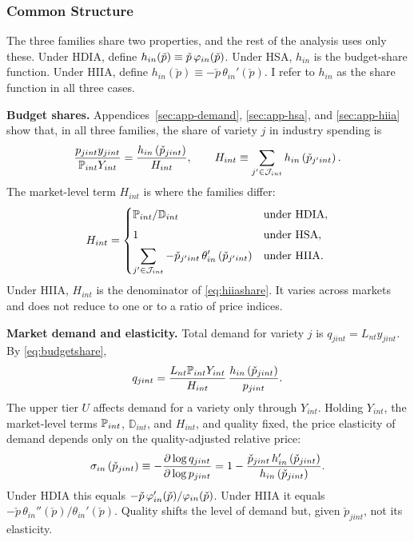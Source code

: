 \subsubsection{Common Structure}\label{sec:common}

The three families share two properties, and the rest of the analysis uses only these.
Under HDIA, define $h_{in}(\check{p}) \equiv \check{p} \, \vp_{in}(\check{p})$.
Under HSA, $h_{in}$ is the budget-share function.
Under HIIA, define $h_{in}(\check{p}) \equiv -\check{p} \, \theta_{in}'(\check{p})$.
I refer to $h_{in}$ as the share function in all three cases.

\textbf{Budget shares.}
Appendices~\ref{sec:app-demand}, \ref{sec:app-hsa}, and \ref{sec:app-hiia} show that, in all three families, the share of variety $j$ in industry spending is
\begin{equation}\label{eq:budgetshare}
	\frac{p_{jint} y_{jint}}{\P_{int} Y_{int}} = \frac{h_{in}\left(\check{p}_{jint}\right)}{H_{int}},
	\qquad
	H_{int} \equiv \sum_{j' \in \cJ_{int}} h_{in}\left(\check{p}_{j'int}\right).
\end{equation}
The market-level term $H_{int}$ is where the families differ:
\begin{equation}\label{eq:Hterm}
	H_{int} =
	\begin{cases}
		\P_{int}/\mathbb{D}_{int} & \text{under HDIA}, \\[4pt]
		1 & \text{under HSA}, \\[4pt]
		\displaystyle \sum_{j' \in \cJ_{int}} -\check{p}_{j'int} \, \theta_{in}'\left(\check{p}_{j'int}\right) & \text{under HIIA}.
	\end{cases}
\end{equation}
Under HIIA, $H_{int}$ is the denominator of \eqref{eq:hiiashare}.
It varies across markets and does not reduce to one or to a ratio of price indices.

\textbf{Market demand and elasticity.}
Total demand for variety $j$ is $q_{jint} = L_{nt} y_{jint}$.
By \eqref{eq:budgetshare},
\begin{equation}\label{eq:marketdemand}
	q_{jint} = \frac{L_{nt} \P_{int} Y_{int}}{H_{int}} \, \frac{h_{in}\left(\check{p}_{jint}\right)}{p_{jint}}.
\end{equation}
The upper tier $U$ affects demand for a variety only through $Y_{int}$.
Holding $Y_{int}$, the market-level terms $\P_{int}$, $\mathbb{D}_{int}$, and $H_{int}$, and quality fixed, the price elasticity of demand depends only on the quality-adjusted relative price:
\begin{equation}\label{eq:sigma}
	\s_{in}\left(\check{p}_{jint}\right) \equiv -\frac{\partial \log q_{jint}}{\partial \log p_{jint}} = 1 - \frac{\check{p}_{jint} \, h_{in}'\left(\check{p}_{jint}\right)}{h_{in}\left(\check{p}_{jint}\right)}.
\end{equation}
Under HDIA this equals $-\check{p}\,\vp_{in}'(\check{p})/\vp_{in}(\check{p})$.
Under HIIA it equals $-\check{p}\,\theta_{in}''(\check{p})/\theta_{in}'(\check{p})$.
Quality shifts the level of demand but, given $\check{p}_{jint}$, not its elasticity.

